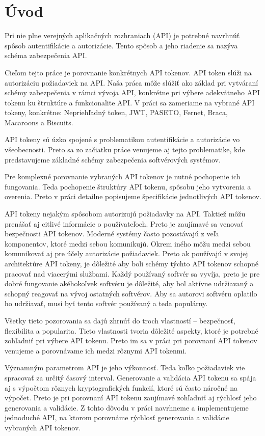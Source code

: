 \chapter*{Úvod} %

Pri nie plne verejných aplikačných rozhraniach (API) je potrebné navrhnúť spôsob autentifikácie a autorizácie. Tento spôsob a jeho riadenie sa nazýva schéma zabezpečenia API.

Cieľom tejto práce je porovnanie konkrétnych API tokenov. API token slúži na autorizáciu požiadaviek na API. Naša práca môže slúžiť ako základ pri vytváraní schémy zabezpečenia v rámci vývoja API, konkrétne pri výbere adekvátneho API tokenu ku štruktúre a funkcionalite API. V práci sa zameriame na vybrané API tokeny, konkrétne: Nepriehľadný token, JWT, PASETO, Fernet, Braca, Macaroons a Biscuits. 

API tokeny sú úzko spojené s problematikou autentifikácie a autorizácie vo všeobecnosti. Preto sa zo začiatku práce venujeme aj tejto problematike, kde predstavujeme základné schémy zabezpečenia softvérových systémov.

Pre komplexné porovnanie vybraných API tokenov je nutné pochopenie ich fungovania. Teda pochopenie štruktúry API tokenu, spôsobu jeho vytvorenia a overenia. Preto v práci detailne popisujeme špecifikácie jednotlivých API tokenov.

API tokeny nejakým spôsobom autorizujú požiadavky na API. Taktiež môžu prenášať aj citlivé informácie o používateľoch. Preto je zaujímavé sa venovať bezpečnosti API tokenov. Moderné systémy často pozostávajú z veľa komponentov, ktoré medzi sebou komunikujú. Okrem iného môžu medzi sebou komunikovať aj pre účely autorizácie požiadaviek. Preto ak používajú v svojej architektúre API tokeny, je dôležité aby boli schémy týchto API tokenov schopné pracovať nad viacerými službami. Každý používaný softvér sa vyvíja, preto je pre dobré fungovanie akéhokoľvek softvéru je dôležité, aby bol aktívne udržiavaný a schopný reagovať na vývoj ostatných softvérov. Aby sa autorovi softvéru oplatilo ho udržiavať, musí byť tento softvér používaný a teda populárny.

Všetky tieto pozorovania sa dajú zhrnúť do troch vlastností -- bezpečnosť, flexibilita a popularita. Tieto vlastnosti tvoria dôležité aspekty, ktoré je potrebné zohľadniť pri výbere API tokenu. Preto im sa v práci pri porovnaní API tokenov venujeme a porovnávame ich medzi rôznymi API tokenmi.

Významným parametrom API je jeho výkonnosť. Teda koľko požiadaviek vie spracovať za určitý časový interval. Generovanie a validácia API tokenu sa spája aj s výpočtom rôznych kryptografických funkcií, ktoré sú často náročné na výpočet. Preto je pri porovnaní API tokenu zaujímavé zohľadniť aj rýchlosť jeho generovania a validácie. Z tohto dôvodu v práci navrhneme a implementujeme jednoduché API, na ktorom porovnáme rýchlosť generovania a validácie vybraných API tokenov.
